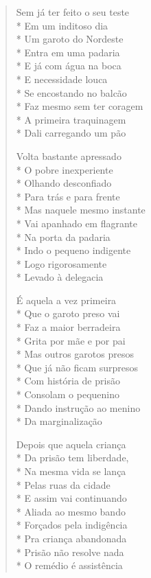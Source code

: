 \begin{verse}
Sem já ter feito o seu teste\\*
Em um inditoso dia\\*
Um garoto do Nordeste\\*
Entra em uma padaria\\*
E já com água na boca\\*
E necessidade louca\\*
Se encostando no balcão\\*
Faz mesmo sem ter coragem\\*
A primeira traquinagem\\*
Dali carregando um pão

Volta bastante apressado\\*
O pobre inexperiente\\*
Olhando desconfiado\\*
Para trás e para frente\\*
Mas naquele mesmo instante\\*
Vai apanhado em flagrante\\*
Na porta da padaria\\*
Indo o pequeno indigente\\*
Logo rigorosamente\\*
Levado à delegacia

É aquela a vez primeira\\*
Que o garoto preso vai\\*
Faz a maior berradeira\\*
Grita por mãe e por pai\\*
Mas outros garotos presos\\*
Que já não ficam surpresos\\*
Com história de prisão\\*
Consolam o pequenino\\*
Dando instrução ao menino\\*
Da marginalização

Depois que aquela criança\\*
Da prisão tem liberdade,\\*
Na mesma vida se lança\\*
Pelas ruas da cidade\\*
E assim vai continuando\\*
Aliada ao mesmo bando\\*
Forçados pela indigência\\*
Pra criança abandonada\\*
Prisão não resolve nada\\*
O remédio é assistência


\end{verse}
